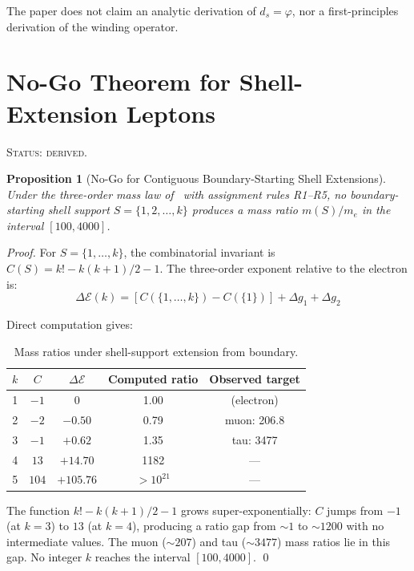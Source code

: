 \documentclass[12pt]{article}
\newtheorem{proposition}[theorem]{Proposition}
\newcommand{\phig}{\varphi}
\newcommand{\ds}{d_s}
\begin{document}
The paper does not claim an analytic derivation of $\ds = \phig$, nor a first-principles derivation of the winding operator.

\section{No-Go Theorem for Shell-Extension Leptons}\label{sec:nogo}

\textsc{Status: derived.}

\begin{proposition}[No-Go for Contiguous Boundary-Starting Shell Extensions]\label{prop:nogo}
Under the three-order mass law of~\citep{SmartI} with assignment rules R1--R5, no boundary-starting shell support $S = \{1, 2, \ldots, k\}$ produces a mass ratio $m(S)/m_e$ in the interval $[100, 4000]$.
\end{proposition}

\begin{proof}
For $S = \{1, \ldots, k\}$, the combinatorial invariant is $C(S) = k! - k(k{+}1)/2 - 1$. The three-order exponent relative to the electron is:
\[
\Delta\mathcal{E}(k) = [C(\{1,\ldots,k\}) - C(\{1\})] + \Delta g_1 + \Delta g_2
\]

Direct computation gives:

\begin{table}[ht]
\centering
\caption{Mass ratios under shell-support extension from boundary.}
\label{tab:nogo}
\begin{tabular}{@{}ccccc@{}}
\toprule
$k$ & $C$ & $\Delta\mathcal{E}$ & Computed ratio & Observed target \\
\midrule
1 & $-1$ & 0 & 1.00 & (electron) \\
2 & $-2$ & $-0.50$ & 0.79 & muon: 206.8 \\
3 & $-1$ & $+0.62$ & 1.35 & tau: 3477 \\
4 & $13$ & $+14.70$ & 1182 & --- \\
5 & $104$ & $+105.76$ & $>10^{21}$ & --- \\
\bottomrule
\end{tabular}
\end{table}

The function $k! - k(k{+}1)/2 - 1$ grows super-exponentially: $C$ jumps from $-1$ (at $k = 3$) to $13$ (at $k = 4$), producing a ratio gap from $\sim\!1$ to $\sim\!1200$ with no intermediate values. The muon ($\sim\!207$) and tau ($\sim\!3477$) mass ratios lie in this gap. No integer $k$ reaches the interval $[100, 4000]$. \qed
\end{proof}
\end{document}

